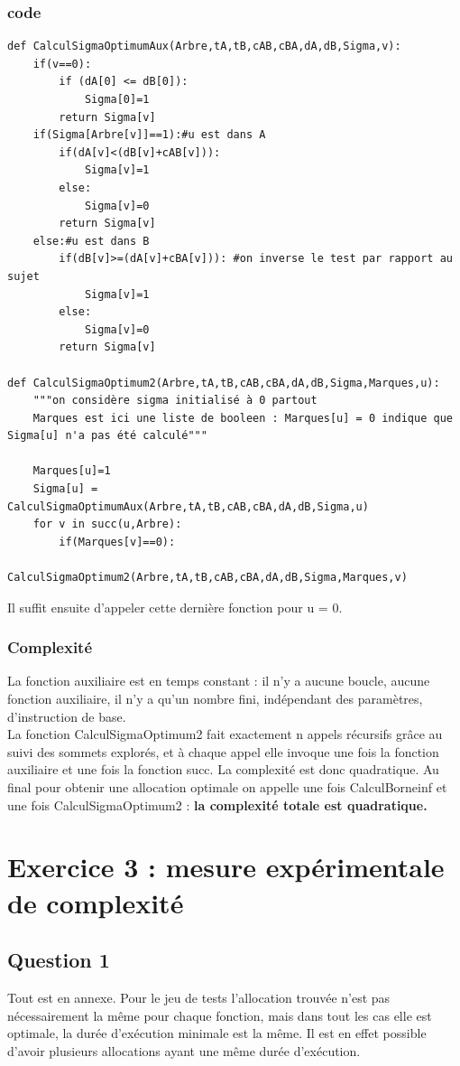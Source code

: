 \documentclass{article}
\begin{document}
\subsubsection{code}
\begin{lstlisting}
def CalculSigmaOptimumAux(Arbre,tA,tB,cAB,cBA,dA,dB,Sigma,v):
    if(v==0):
        if (dA[0] <= dB[0]):
            Sigma[0]=1
        return Sigma[v]
    if(Sigma[Arbre[v]]==1):#u est dans A
        if(dA[v]<(dB[v]+cAB[v])):
            Sigma[v]=1
        else:
            Sigma[v]=0
        return Sigma[v]
    else:#u est dans B
        if(dB[v]>=(dA[v]+cBA[v])): #on inverse le test par rapport au sujet
            Sigma[v]=1
        else:
            Sigma[v]=0
        return Sigma[v]
        
def CalculSigmaOptimum2(Arbre,tA,tB,cAB,cBA,dA,dB,Sigma,Marques,u):
    """on considère sigma initialisé à 0 partout
    Marques est ici une liste de booleen : Marques[u] = 0 indique que Sigma[u] n'a pas été calculé"""
   
    Marques[u]=1
    Sigma[u] = CalculSigmaOptimumAux(Arbre,tA,tB,cAB,cBA,dA,dB,Sigma,u)
    for v in succ(u,Arbre):
        if(Marques[v]==0):
            CalculSigmaOptimum2(Arbre,tA,tB,cAB,cBA,dA,dB,Sigma,Marques,v)
\end{lstlisting}
Il suffit ensuite d'appeler cette dernière fonction pour u = 0.
\subsubsection{Complexité}
La fonction auxiliaire est en temps constant : il n'y a aucune boucle, aucune fonction auxiliaire, il n'y a qu'un nombre fini, indépendant des paramètres, d'instruction de base. \\
La fonction CalculSigmaOptimum2 fait exactement n appels récursifs grâce au suivi des sommets explorés, et à chaque appel elle invoque une fois la fonction auxiliaire et une fois la fonction succ. 
La complexité est donc quadratique. Au final pour obtenir une allocation optimale on appelle une fois CalculBorneinf et une fois CalculSigmaOptimum2 : \textbf{la complexité totale est quadratique.}

\section{Exercice 3 : mesure expérimentale de complexité}
\subsection{Question 1}
Tout est en annexe. Pour le jeu de tests l'allocation trouvée n'est pas nécessairement la même pour chaque fonction, mais dans tout les cas elle est optimale, la durée d'exécution minimale est la même. Il est en effet possible d'avoir plusieurs allocations ayant une même durée d'exécution. 
\end{document}

